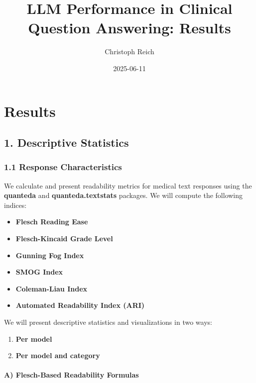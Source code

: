 \documentclass[
  11pt]{report}
\title{LLM Performance in Clinical Question Answering: Results}
\author{Christoph Reich}
\date{2025-06-11}
\providecommand{\tightlist}{%
  \setlength{\itemsep}{0pt}\setlength{\parskip}{0pt}}\usepackage{longtable,booktabs,array}
\renewcommand*\contentsname{Table of contents}
\newcommand\contentsname{Table of contents}
\begin{document}
\maketitle

\renewcommand*\contentsname{Table of contents}
{
\hypersetup{linkcolor=}
\setcounter{tocdepth}{2}
\tableofcontents
}

\chapter{Results}\label{results}

\section{1. Descriptive Statistics}\label{descriptive-statistics}

\subsection{1.1 Response
Characteristics}\label{response-characteristics}

We calculate and present readability metrics for medical text responses
using the \textbf{quanteda} and \textbf{quanteda.textstats} packages. We
will compute the following indices:

\begin{itemize}
\tightlist
\item
  \textbf{Flesch Reading Ease}
\item
  \textbf{Flesch-Kincaid Grade Level}
\item
  \textbf{Gunning Fog Index}
\item
  \textbf{SMOG Index}
\item
  \textbf{Coleman-Liau Index}
\item
  \textbf{Automated Readability Index (ARI)}
\end{itemize}

We will present descriptive statistics and visualizations in two ways:

\begin{enumerate}
\def\labelenumi{\arabic{enumi}.}
\tightlist
\item
  \textbf{Per model}
\item
  \textbf{Per model and category}
\end{enumerate}

\subsubsection{A) Flesch-Based Readability
Formulas}\label{a-flesch-based-readability-formulas}
\end{document}
